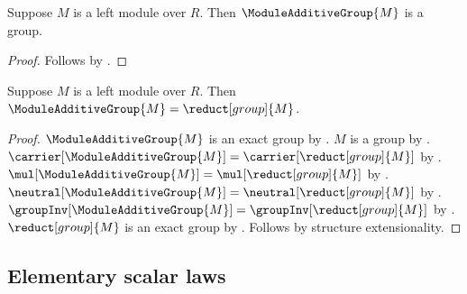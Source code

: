 \begin{corollary}\label{module_additive_group_is_group}
    Suppose $M$ is a left module over $R$.
    Then $\ModuleAdditiveGroup{M}$ is a group.
\end{corollary}
\begin{proof}
    Follows by
        .
\end{proof}

\begin{theorem}\label{module_additive_group_eq_group_reduct}
    Suppose $M$ is a left module over $R$.
    Then $\ModuleAdditiveGroup{M}=\reduct[group]{M}$.
\end{theorem}
\begin{proof}
    $\ModuleAdditiveGroup{M}$ is an exact group by
        .
    $M$ is a group by .
    $\carrier[\ModuleAdditiveGroup{M}]=\carrier[\reduct[group]{M}]$ by
        .
    $\mul[\ModuleAdditiveGroup{M}]=\mul[\reduct[group]{M}]$ by
        .
    $\neutral[\ModuleAdditiveGroup{M}]=\neutral[\reduct[group]{M}]$ by
        .
    $\groupInv[\ModuleAdditiveGroup{M}]
        =\groupInv[\reduct[group]{M}]$ by
        .
    $\reduct[group]{M}$ is an exact group by
        .
    Follows by structure extensionality.
\end{proof}

\subsection{Elementary scalar laws}

